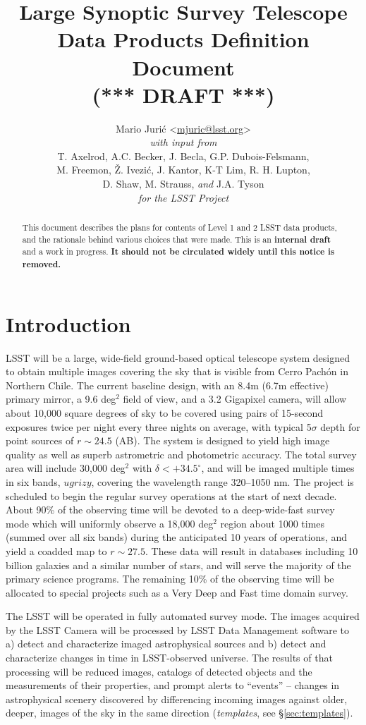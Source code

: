 \documentclass[12pt]{article}
\title{Large Synoptic Survey Telescope \\
Data Products Definition Document \\
(*** DRAFT ***)}
\author{
    Mario Juri\'c \textless\href{mailto:mjuric@lsst.org}{mjuric@lsst.org}\textgreater \vspace{1ex} \\
    {\em with input from} \vspace{1ex} \\
    T. Axelrod, A.C. Becker, J. Becla,  G.P. Dubois-Felsmann, \\
    M. Freemon, \v{Z}. Ivezi\'c, J. Kantor, K-T Lim, R. H. Lupton, \\
    D. Shaw, M. Strauss, {\em and} J.A. Tyson \vspace{1.2ex} \\
    {\em for the LSST Project}
}
\newcommand{\B}[1]{{#1}}
\newcommand{\R}[1]{{\color{red}}}
\begin{document}
\maketitle

\begin{abstract}
This document describes the plans for contents of Level 1 and 2 LSST data products, and the rationale behind various choices that were made. This is an {\bf internal draft} and a work in progress. {\bf It should not be circulated widely until this notice is removed.}
\end{abstract}

\tableofcontents

\section{Introduction}

LSST will be a large, wide-field ground-based optical telescope system
designed to obtain multiple images covering the sky that is visible from Cerro Pach\'{o}n in Northern Chile. The current baseline design, with an 8.4m (6.7m effective) primary mirror, a 9.6 deg$^2$ field of view, and a 3.2 Gigapixel camera, will allow about 10,000 square degrees of sky to be covered using pairs  of 15-second exposures \R{in two photometric bands} \B{twice per night} every three nights on average, with typical 5$\sigma$ depth for point sources of $r\sim24.5$ (AB). The system is designed to yield high image quality as well as superb astrometric  and photometric accuracy. The \B{total} survey area will include 30,000 deg$^2$ with $\delta<+34.5^\circ$, and will be imaged multiple times in six bands, $ugrizy$, covering the wavelength range 320--1050 nm. The project is scheduled to  begin the regular survey operations at the start of next decade. About 90\% of the observing time will be devoted to a deep-wide-fast survey mode which will \B{uniformly} observe a 18,000 deg$^2$ region about 1000 times (summed over all six bands) during the anticipated 10 years of operations, and yield a coadded map to $r\sim27.5$. These data will result in databases including 10 billion galaxies and a similar number of stars, and will serve the majority of the primary science programs. The remaining 10\% of the observing time will be allocated to special projects such as a Very Deep and Fast time domain survey.

The LSST will be operated in fully automated survey mode. The images acquired by the LSST Camera will be processed by LSST Data Management software to a) detect and characterize imaged astrophysical sources and b) detect and characterize changes in time in LSST-observed universe. The results of that processing will be reduced images, catalogs of detected objects and the measurements of their properties, and prompt alerts to ``events'' -- changes in astrophysical scenery discovered by differencing incoming images against older, deeper, images of the sky in the same direction ({\em templates}, see \S \ref{sec:templates}).
\end{document}
